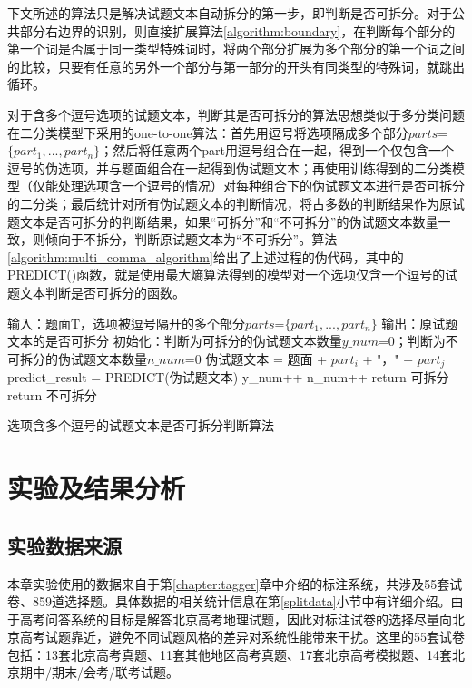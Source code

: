 \documentclass[master, winfont]{njuthesis}
\begin{document}
下文所述的算法只是解决试题文本自动拆分的第一步，即判断是否可拆分。对于公共部分右边界的识别，则直接扩展算法\ref{algorithm:boundary}，在判断每个部分的第一个词是否属于同一类型特殊词时，将两个部分扩展为多个部分的第一个词之间的比较，只要有任意的另外一个部分与第一部分的开头有同类型的特殊词，就跳出循环。

对于含多个逗号选项的试题文本，判断其是否可拆分的算法思想类似于多分类问题在二分类模型下采用的one-to-one算法：首先用逗号将选项隔成多个部分$parts$=$\{part_1, ..., part_n\}$；然后将任意两个part用逗号组合在一起，得到一个仅包含一个逗号的伪选项，并与题面组合在一起得到伪试题文本；再使用训练得到的二分类模型（仅能处理选项含一个逗号的情况）对每种组合下的伪试题文本进行是否可拆分的二分类；最后统计对所有伪试题文本的判断情况，将占多数的判断结果作为原试题文本是否可拆分的判断结果，如果“可拆分”和“不可拆分”的伪试题文本数量一致，则倾向于不拆分，判断原试题文本为“不可拆分”。算法\ref{algorithm:multi_comma_algorithm}给出了上述过程的伪代码，其中的PREDICT()函数，就是使用最大熵算法得到的模型对一个选项仅含一个逗号的试题文本判断是否可拆分的函数。

\begin{algorithm}
\begin{algorithmic}[1]
\STATE 输入：题面T，选项被逗号隔开的多个部分$parts$=$\{part_1, ..., part_n\}$
\STATE 输出：原试题文本的是否可拆分
\STATE 初始化：判断为可拆分的伪试题文本数量$y\_num$=0；判断为不可拆分的伪试题文本数量$n\_num$=0
		\STATE 伪试题文本 = 题面 + $part_i$ + "，" + $part_j$
		\STATE predict\_result = PREDICT(伪试题文本)
			\STATE y\_num++
		\ELSE
			\STATE n\_num++
		\ENDIF
	\ENDFOR
\ENDFOR
{}
	\STATE return 可拆分
\ELSE
	\STATE return 不可拆分
\ENDIF
\end{algorithmic}
\caption{\label{algorithm:multi_comma_algorithm}选项含多个逗号的试题文本是否可拆分判断算法}
\end{algorithm}

\section{实验及结果分析}
\subsection{实验数据来源}
本章实验使用的数据来自于第\ref{chapter:tagger}章中介绍的标注系统，共涉及55套试卷、859道选择题。具体数据的相关统计信息在第\ref{splitdata}小节中有详细介绍。由于高考问答系统的目标是解答北京高考地理试题，因此对标注试卷的选择尽量向北京高考试题靠近，避免不同试题风格的差异对系统性能带来干扰。这里的55套试卷包括：13套北京高考真题、11套其他地区高考真题、17套北京高考模拟题、14套北京期中/期末/会考/联考试题。
\end{document}

